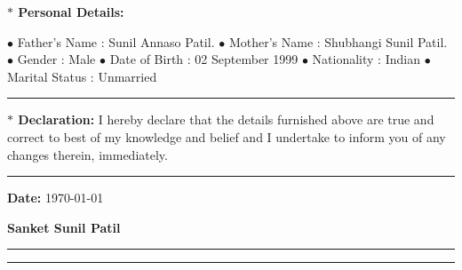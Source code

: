 \documentclass[a4paper,11pt]{article} %
\begin{document}
			\textbf{\large $\ast$ Personal Details:\medskip}{
			
			$\bullet$ Father's Name : Sunil Annaso Patil.\newline
			$\bullet$ Mother's Name : Shubhangi Sunil Patil.\newline
			$\bullet$ Gender : Male \newline
			$\bullet$ Date of Birth : 02 September 1999 \newline
			$\bullet$ Nationality : Indian \newline
			$\bullet$ Marital Status : Unmarried \newline
			
			}

\hrule	
\bigskip

\textbf{\large $\ast$ Declaration:} 
I hereby declare that the details furnished above are true and correct to best of my knowledge and belief and I undertake to inform you of any changes therein, immediately.\linebreak\linebreak


\hrule	
\bigskip

\begin{minipage}[t]{0.5\textwidth}
			\raggedright
			\textbf{Date:} \today
		\end{minipage}

		\begin{minipage}[t]{0.9\textwidth}
			\raggedleft
			
			\textbf{Sanket Sunil Patil}
		\end{minipage}
\bigskip
\hrule	
\smallskip
\hrule
\end{document}
